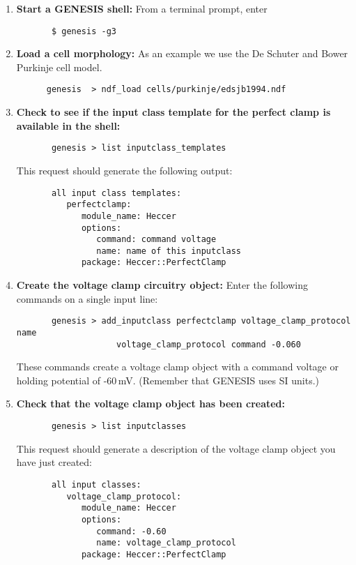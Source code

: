 \documentclass[12pt]{article}
\begin{document}
\begin{enumerate}

	\item{\bf Start a GENESIS shell:} From a terminal prompt, enter
	\begin{verbatim}
	   $ genesis -g3
	\end{verbatim}
	
	\item{\bf Load a cell morphology:} As an example we use the De Schuter and Bower Purkinje cell model.
	\begin{verbatim}
	  genesis  > ndf_load cells/purkinje/edsjb1994.ndf
	\end{verbatim}
	
	\item{\bf Check to see if the input class template for the perfect clamp is available in the shell:}
	\begin{verbatim}
	   genesis > list inputclass_templates
	\end{verbatim}
	This request should generate the following output:
	\begin{verbatim}
	   all input class templates: 
	      perfectclamp:
	         module_name: Heccer
	         options:
	            command: command voltage
	            name: name of this inputclass
	         package: Heccer::PerfectClamp
	\end{verbatim}
	
	\item{\bf Create the voltage clamp circuitry object:} Enter the following commands on a single input line:
	\begin{verbatim}
	   genesis > add_inputclass perfectclamp voltage_clamp_protocol name
	                voltage_clamp_protocol command -0.060
	\end{verbatim}
	These commands create a voltage clamp object with a command voltage or holding potential of -60\,mV. (Remember that GENESIS uses SI units.)
	
	\item{\bf Check that the voltage clamp object has been created:}
	\begin{verbatim}
	   genesis > list inputclasses
	\end{verbatim}
	This request should generate a description of the voltage clamp object you have just created:
	\begin{verbatim}
	   all input classes: 
	      voltage_clamp_protocol:
	         module_name: Heccer
	         options:
	            command: -0.60
	            name: voltage_clamp_protocol
	         package: Heccer::PerfectClamp
	\end{verbatim}
	

\end{enumerate}
\end{document}
